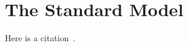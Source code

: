 \chapter[The Standard Model][The Standard Model]{The Standard Model}
\label{chap:standardmodel}

Here is a citation~\cite{1999.ATLAS.Physics-TDR}.


